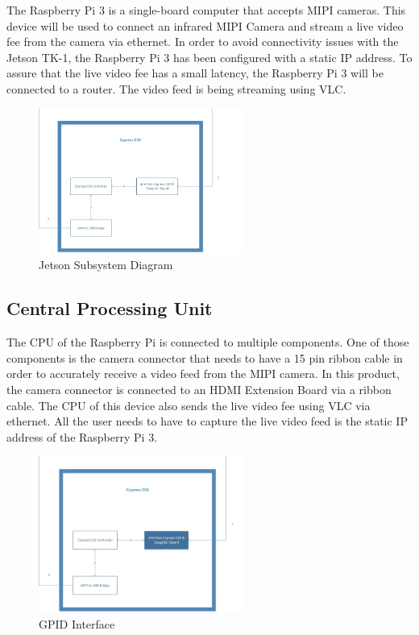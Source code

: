 The Raspberry Pi 3 is a single-board computer that accepts MIPI cameras. This device will be used to connect an infrared MIPI Camera and stream a live video fee from the camera via ethernet. In order to avoid connectivity issues with the Jetson TK-1, the Raspberry Pi 3 has been configured with a static IP address. To assure that the live video fee has a small latency, the Raspberry Pi 3 will be connected to a router. The video feed is being streaming using VLC. 

\begin{figure}[h!]
	\centering
 	\includegraphics[width=0.60\textwidth]{images/Cypress}
 \caption{Jetson Subsystem Diagram}
\end{figure}


\subsection{Central Processing Unit}
The CPU of the Raspberry Pi is connected to multiple components. One of those components is the camera connector that needs to have a 15 pin ribbon cable in order to accurately receive a video feed from the MIPI camera. In this product, the camera connector is connected to an HDMI Extension Board via a ribbon cable. The CPU of this device also sends the live video fee using VLC via ethernet. All the user needs to have to capture the live video feed is the static IP address of the Raspberry Pi 3. 

\begin{figure}[h!]
	\centering
 	\includegraphics[width=0.60\textwidth]{images/Cypress_Interface}
 \caption{GPID Interface}
\end{figure}

